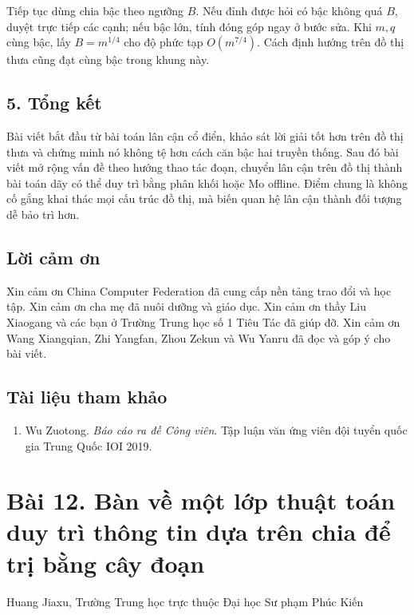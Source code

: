 \documentclass[11pt]{article}
\begin{document}
Tiếp tục dùng chia bậc theo ngưỡng \(B\). Nếu đỉnh được hỏi có bậc không quá
\(B\), duyệt trực tiếp các cạnh; nếu bậc lớn, tính đóng góp ngay ở bước sửa.
Khi \(m,q\) cùng bậc, lấy \(B=m^{1/4}\) cho độ phức tạp \(O(m^{7/4})\). Cách
định hướng trên đồ thị thưa cũng đạt cùng bậc trong khung này.

\subsection*{5. Tổng kết}

Bài viết bắt đầu từ bài toán lân cận cổ điển, khảo sát lời giải tốt hơn trên
đồ thị thưa và chứng minh nó không tệ hơn cách căn bậc hai truyền thống. Sau
đó bài viết mở rộng vấn đề theo hướng thao tác đoạn, chuyển lân cận trên đồ
thị thành bài toán dãy có thể duy trì bằng phân khối hoặc Mo offline. Điểm
chung là không cố gắng khai thác mọi cấu trúc đồ thị, mà biến quan hệ lân cận
thành đối tượng dễ bảo trì hơn.

\subsection*{Lời cảm ơn}

Xin cảm ơn China Computer Federation đã cung cấp nền tảng trao đổi và học tập.
Xin cảm ơn cha mẹ đã nuôi dưỡng và giáo dục. Xin cảm ơn thầy Liu Xiaogang và
các bạn ở Trường Trung học số 1 Tiêu Tác đã giúp đỡ. Xin cảm ơn Wang Xiangqian,
Zhi Yangfan, Zhou Zekun và Wu Yanru đã đọc và góp ý cho bài viết.

\subsection*{Tài liệu tham khảo}

\begin{enumerate}
  \item Wu Zuotong. \emph{Báo cáo ra đề Công viên}. Tập luận văn ứng viên đội
  tuyển quốc gia Trung Quốc IOI 2019.
\end{enumerate}

\section*{Bài 12. Bàn về một lớp thuật toán duy trì thông tin dựa trên chia để trị bằng cây đoạn}

\begin{center}
Huang Jiaxu, Trường Trung học trực thuộc Đại học Sư phạm Phúc Kiến
\end{center}
\end{document}

